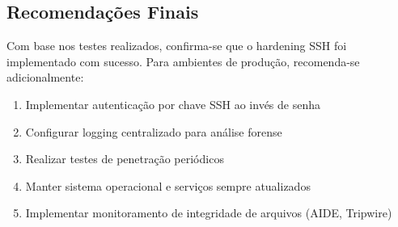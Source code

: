 \documentclass[12pt]{article}
\begin{document}
\subsection{Recomendações Finais}

Com base nos testes realizados, confirma-se que o hardening SSH foi implementado com sucesso. Para ambientes de produção, recomenda-se adicionalmente:
\begin{enumerate}
    \item Implementar autenticação por chave SSH ao invés de senha
    \item Configurar logging centralizado para análise forense
    \item Realizar testes de penetração periódicos
    \item Manter sistema operacional e serviços sempre atualizados
    \item Implementar monitoramento de integridade de arquivos (AIDE, Tripwire)
\end{enumerate}
\end{document}
